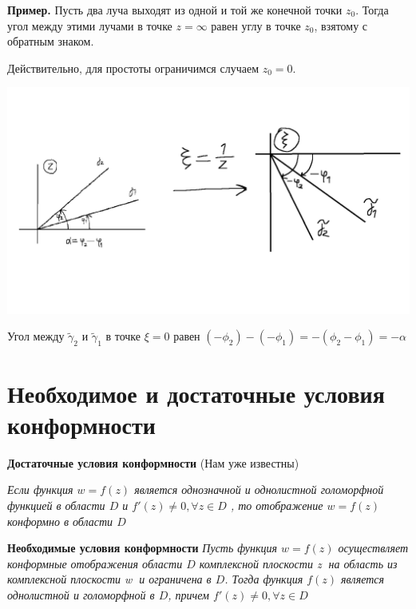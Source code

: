 \documentclass[a4paper, 12pt]{report}
\begin{document}
\textbf{Пример.} \quad
Пусть два луча выходят из одной и той же конечной точки $z_0$. Тогда угол между этими лучами в точке $z = \infty$ равен углу в точке $z_0$, взятому с обратным знаком.
\par\bigskip

Действительно, для простоты ограничимся случаем $z_0 = 0$.

\includegraphics[width=15 cm]{graphic.png}

Угол между $\tilde \gamma_2$ и $\tilde \gamma_1$ в точке $\xi = 0$ равен $(-\phi_2)-(-\phi_1) = -(\phi_2 - \phi_1) = -\alpha$




\section{Необходимое и достаточные условия конформности}

\hangindent=11pt  \noindent
\textbf{Достаточные условия конформности}
(Нам уже известны)

\textit{Если функция \(w = f(z)\)  является однозначной и однолистной голоморфной функцией в области \(D\) и \(f'(z) \neq 0,  \forall z \in D\) , то отображение \(w = f(z)\) конформно в области \(D\) }
\bigskip

\hangindent=11pt  \noindent
\textbf{Необходимые условия конформности}
\textit{Пусть функция \(w=f(z)\)  осуществляет конформные отображения области \(D\) комплексной плоскости \textcircled{z} на область  из комплексной плоскости \textcircled{w} и ограничена в \(D\). Тогда функция \(f(z)\) является однолистной и голоморфной в \(D\), причем \(f'(z) \neq 0,  \forall z \in D\)  }
\end{document}
